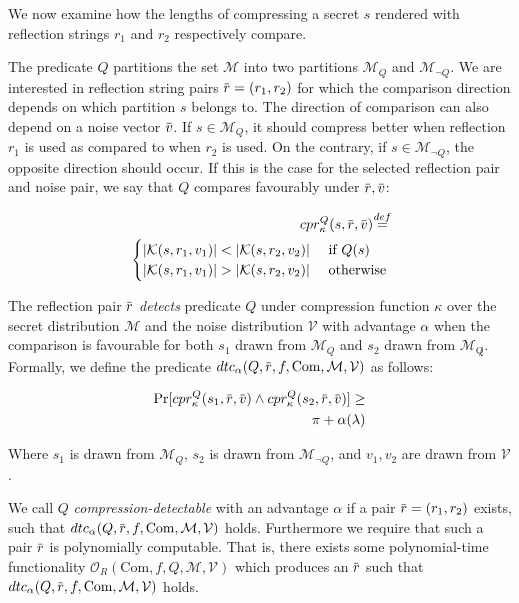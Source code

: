 \documentclass[conference, letterpaper, 10pt]{IEEEtran}
\newcommand\defeq{\stackrel{\mathclap{\normalfont\mbox{def}}}{=}}
\newcommand{\overbar}[1]{\mkern 1.5mu\overline{\mkern-1.5mu#1\mkern-1.5mu}\mkern 1.5mu}
\begin{document}
We now examine how the lengths of compressing a secret $s$ rendered with
reflection strings $r_1$ and $r_2$ respectively compare.

The predicate $Q$ partitions the set $\mathcal{M}$ into two partitions
$\mathcal{M}_Q$ and $\mathcal{M}_{\lnot Q}$. We are interested in reflection
string pairs $\overbar{r} = (r_1, r_2)$ for which the comparison direction
depends on which partition $s$ belongs to.  The direction of comparison can
also depend on a noise vector $\overbar{v}$.  If $s \in \mathcal{M}_Q$, it
should compress better when reflection $r_1$ is used as compared to when $r_2$
is used. On the contrary, if $s \in \mathcal{M}_{\lnot Q}$, the opposite
direction should occur.  If this is the case for the selected reflection pair
and noise pair, we say that $Q$ compares favourably under $\overbar{r},
\overbar{v}$:

\begin{equation*}
\begin{split}
    cpr^Q_{\kappa}(s, \overbar{r}, \overbar{v})
    \defeq\\
    \begin{cases}
        |\mathcal{K}(s, r_1, v_1)| < |\mathcal{K}(s, r_2, v_2)| &\text{ if } Q(s)\\
        |\mathcal{K}(s, r_1, v_1)| > |\mathcal{K}(s, r_2, v_2)| &\text{ otherwise}
    \end{cases}
\end{split}
\end{equation*}

The reflection pair $\overbar{r}$ \textit{detects} predicate $Q$ under
compression function $\kappa$ over the secret distribution $\mathcal{M}$ and
the noise distribution $\mathcal{V}$ with advantage $\alpha$ when the
comparison is favourable for both $s_1$ drawn from $\mathcal{M}_Q$ and $s_2$
drawn from $\mathcal{M}_{\not Q}$. Formally, we define the predicate
$dtc_\alpha(Q, \overbar{r}, f, \textrm{Com}, \mathcal{M}, \mathcal{V})$ as follows:

\begin{align*}
    \Pr
        [cpr^Q_{\kappa}(s_1, \overbar{r}, \overbar{v}) \land
         cpr^Q_{\kappa}(s_2, \overbar{r}, \overbar{v})]
    \geq\\
    \pi + \alpha(\lambda)
\end{align*}

Where $s_1$ is drawn from $\mathcal{M}_Q$, $s_2$ is drawn from
$\mathcal{M}_{\lnot Q}$, and $v_1, v_2$ are drawn from $\mathcal{V}$.

We call $Q$ \textit{compression-detectable} with an advantage $\alpha$ if a
pair $\overbar{r} = (r_1, r_2)$ exists, such that $dtc_\alpha(Q, \overbar{r},
f, \textrm{Com}, \mathcal{M}, \mathcal{V})$ holds. Furthermore we require that such a
pair $\overbar{r}$ is polynomially computable. That is, there exists some
polynomial-time functionality $\mathcal{O}_R(\textrm{Com}, f, Q, \mathcal{M},
\mathcal{V})$ which produces an $\overbar{r}$ such that $dtc_\alpha(Q,
\overbar{r}, f, \textrm{Com}, \mathcal{M}, \mathcal{V})$ holds.
\end{document}
